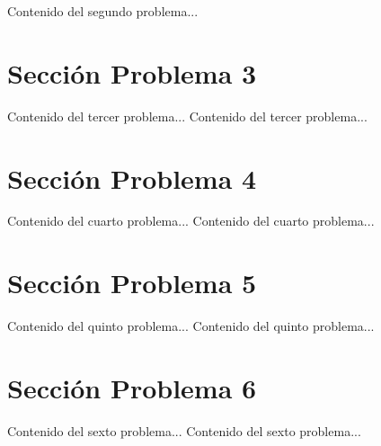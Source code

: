 \documentclass{IEEEcsmag}
\begin{document}
\newpage
Contenido del segundo problema...
\newpage


\section{Sección Problema 3}
Contenido del tercer problema...
\newpage 
Contenido del tercer problema...
\newpage 


\section{Sección Problema 4}
Contenido del cuarto problema...
\newpage 
Contenido del cuarto problema...
\newpage 


\section{Sección Problema 5}
Contenido del quinto problema...
\newpage 
Contenido del quinto problema...
\newpage 


\section{Sección Problema 6}
Contenido del sexto problema...
\newpage 
Contenido del sexto problema...
\newpage 
\end{document}
